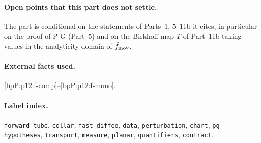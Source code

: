\paragraph{Open points that this part does not settle.} The part is conditional on the statements of Parts~1, 5--11b it cites, in particular on the proof of P-G (Part~5) and on the Birkhoff map $T$ of Part~11b taking values in the analyticity domain of $\hat f_{\rm mov}$.

\paragraph{External facts used.} \ref{bpP:p12:f-comp}--\ref{bpP:p12:f-mono}.

\paragraph{Label index.} \texttt{forward-tube}, \texttt{collar}, \texttt{fast-diffeo}, \texttt{data}, \texttt{perturbation}, \texttt{chart}, \texttt{pg-hypotheses}, \texttt{transport}, \texttt{measure}, \texttt{planar}, \texttt{quantifiers}, \texttt{contract}.
\par\endgroup
